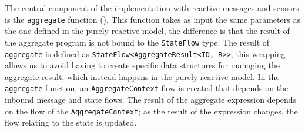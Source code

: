 The central component of the implementation with reactive messages and sensors is the \texttt{aggregate} function (). This function takes as input the same parameters as the one defined in the purely reactive model, the difference is that the result of the aggregate program is not bound to the \texttt{StateFlow} type. The result of \texttt{aggregate} is defined as \texttt{StateFlow<AggregateResult<ID, R>>}, this wrapping allows us to avoid having to create specific data structures for managing the aggregate result, which instead happens in the purely reactive model. In the \texttt{aggregate} function, an \texttt{AggregateContext} flow is created that depends on the inbound message and state flows. The result of the aggregate expression depends on the flow of the \texttt{AggregateContext}; as the result of the expression changes, the flow relating to the state is updated.



